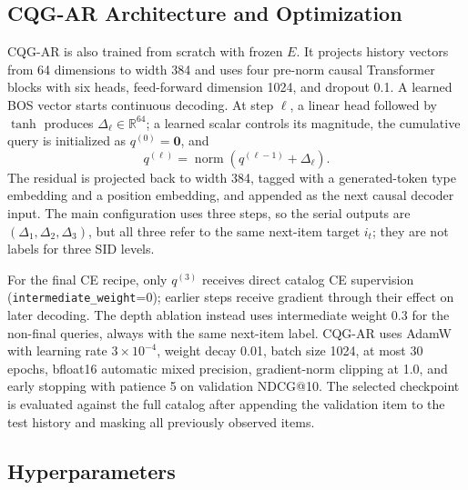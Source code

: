 \documentclass[letterpaper]{article}
\begin{document}
\subsection{CQG-AR Architecture and Optimization}
\label{app:cqg-ar-training}

CQG-AR is also trained from scratch with frozen \(E\).  It projects history
vectors from 64 dimensions to width 384 and uses four pre-norm causal
Transformer blocks with six heads, feed-forward dimension 1024, and dropout
0.1.  A learned BOS vector starts continuous decoding.  At step \(\ell\), a
linear head followed by \(\tanh\) produces
\(\Delta_\ell\in\mathbb{R}^{64}\); a learned scalar controls its magnitude,
the cumulative query is initialized as \(q^{(0)}=\mathbf{0}\), and
\[
 q^{(\ell)}=\operatorname{norm}(q^{(\ell-1)}+\Delta_\ell).
\]
The residual is projected back to width 384, tagged with a generated-token
type embedding and a position embedding, and appended as the next causal
decoder input.  The main configuration uses three steps, so the serial
outputs are \((\Delta_1,\Delta_2,\Delta_3)\), but all three refer to the same
next-item target \(i_t\); they are not labels for three SID levels.

For the final CE recipe, only \(q^{(3)}\) receives direct catalog CE
supervision (\texttt{intermediate\_weight}=0); earlier steps receive gradient
through their effect on later decoding.  The depth ablation instead uses
intermediate weight 0.3 for the non-final queries, always with the same
next-item label.  CQG-AR uses AdamW with learning rate \(3\times10^{-4}\),
weight decay 0.01, batch size 1024, at most 30 epochs, bfloat16 automatic
mixed precision, gradient-norm clipping at 1.0, and early stopping with
patience 5 on validation NDCG@10.  The selected checkpoint is evaluated
against the full catalog after appending the validation item to the test
history and masking all previously observed items.

\subsection{Hyperparameters}
\label{app:hparams}
\end{document}
